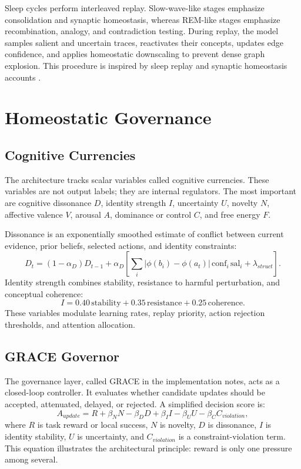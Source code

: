 \documentclass[11pt]{article}
\begin{document}
Sleep cycles perform interleaved replay. Slow-wave-like stages emphasize consolidation and synaptic homeostasis, whereas REM-like stages emphasize recombination, analogy, and contradiction testing. During replay, the model samples salient and uncertain traces, reactivates their concepts, updates edge confidence, and applies homeostatic downscaling to prevent dense graph explosion. This procedure is inspired by sleep replay and synaptic homeostasis accounts \cite{tononi2006,walker2006,diekelmann2010,wilson1994,ji2007}.

\section{Homeostatic Governance}
\subsection{Cognitive Currencies}
The architecture tracks scalar variables called cognitive currencies. These variables are not output labels; they are internal regulators. The most important are cognitive dissonance $D$, identity strength $I$, uncertainty $U$, novelty $N$, affective valence $V$, arousal $A$, dominance or control $C$, and free energy $F$.

Dissonance is an exponentially smoothed estimate of conflict between current evidence, prior beliefs, selected actions, and identity constraints:
\begin{equation}
 D_t=(1-\alpha_D)D_{t-1}+\alpha_D\left[\sum_i \left|\phi(b_i)-\phi(a_t)\right|\,\mathrm{conf}_i\,\mathrm{sal}_i+\lambda_{struct}\right].
\end{equation}
Identity strength combines stability, resistance to harmful perturbation, and conceptual coherence:
\begin{equation}
 I = 0.40\,\mathrm{stability}+0.35\,\mathrm{resistance}+0.25\,\mathrm{coherence}.
\end{equation}
These variables modulate learning rates, replay priority, action rejection thresholds, and attention allocation.

\subsection{GRACE Governor}
The governance layer, called GRACE in the implementation notes, acts as a closed-loop controller. It evaluates whether candidate updates should be accepted, attenuated, delayed, or rejected. A simplified decision score is:
\begin{equation}
 A_{update}=R + \beta_N N - \beta_D D + \beta_I I - \beta_U U - \beta_C C_{violation},
\end{equation}
where $R$ is task reward or local success, $N$ is novelty, $D$ is dissonance, $I$ is identity stability, $U$ is uncertainty, and $C_{violation}$ is a constraint-violation term. This equation illustrates the architectural principle: reward is only one pressure among several.
\end{document}
